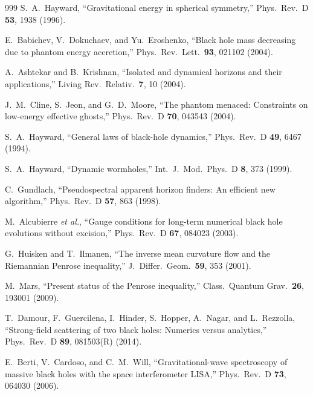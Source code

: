 \documentclass[twocolumn,floatfix,aps,prd,superscriptaddress,nofootinbib,showkeys]{revtex4-2}
\begin{document}
\begin{thebibliography}{999}
S.~A.~Hayward,
\newblock ``Gravitational energy in spherical symmetry,''
\newblock Phys.\ Rev.\ D \textbf{53}, 1938 (1996).

E.~Babichev, V.~Dokuchaev, and Yu.~Eroshenko,
\newblock ``Black hole mass decreasing due to phantom energy accretion,''
\newblock Phys.\ Rev.\ Lett.\ \textbf{93}, 021102 (2004).


A.~Ashtekar and B.~Krishnan,
\newblock ``Isolated and dynamical horizons and their applications,''
\newblock Living Rev.\ Relativ.\ \textbf{7}, 10 (2004).

J.~M.~Cline, S.~Jeon, and G.~D.~Moore,
\newblock ``The phantom menaced: Constraints on low-energy effective ghosts,''
\newblock Phys.\ Rev.\ D \textbf{70}, 043543 (2004).

S.~A.~Hayward,
\newblock ``General laws of black-hole dynamics,''
\newblock Phys.\ Rev.\ D \textbf{49}, 6467 (1994).

S.~A.~Hayward,
\newblock ``Dynamic wormholes,''
\newblock Int.\ J.\ Mod.\ Phys.\ D \textbf{8}, 373 (1999).

C.~Gundlach,
\newblock ``Pseudospectral apparent horizon finders: An efficient new algorithm,''
\newblock Phys.\ Rev.\ D \textbf{57}, 863 (1998).

M.~Alcubierre \emph{et al.},
\newblock ``Gauge conditions for long-term numerical black hole evolutions without excision,''
\newblock Phys.\ Rev.\ D \textbf{67}, 084023 (2003).

G.~Huisken and T.~Ilmanen,
\newblock ``The inverse mean curvature flow and the Riemannian Penrose inequality,''
\newblock J.\ Differ.\ Geom.\ \textbf{59}, 353 (2001).

M.~Mars,
\newblock ``Present status of the Penrose inequality,''
\newblock Class.\ Quantum Grav.\ \textbf{26}, 193001 (2009).

T.~Damour, F.~Guercilena, I.~Hinder, S.~Hopper, A.~Nagar, and L.~Rezzolla,
\newblock ``Strong-field scattering of two black holes: Numerics versus analytics,''
\newblock Phys.\ Rev.\ D \textbf{89}, 081503(R) (2014).

E.~Berti, V.~Cardoso, and C.~M.~Will,
\newblock ``Gravitational-wave spectroscopy of massive black holes with the space interferometer LISA,''
\newblock Phys.\ Rev.\ D \textbf{73}, 064030 (2006).


\end{thebibliography}
\end{document}
